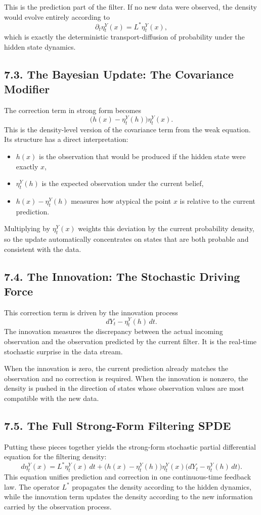 \documentclass[11pt]{article}
\theoremstyle{definition}
\theoremstyle{remark}
\begin{document}
This is the prediction part of the filter. If no new data were observed, the density would evolve entirely according to
\[
\partial_t \eta_t^Y(x)=L^*\eta_t^Y(x),
\]
which is exactly the deterministic transport-diffusion of probability under the hidden state dynamics.

\subsection*{7.3. The Bayesian Update: The Covariance Modifier}
The correction term in strong form becomes
\[
\bigl(h(x)-\eta_t^Y(h)\bigr)\eta_t^Y(x).
\]
This is the density-level version of the covariance term from the weak equation. Its structure has a direct interpretation:
\begin{itemize}
\item \(h(x)\) is the observation that would be produced if the hidden state were exactly \(x\),
\item \(\eta_t^Y(h)\) is the expected observation under the current belief,
\item \(h(x)-\eta_t^Y(h)\) measures how atypical the point \(x\) is relative to the current prediction.
\end{itemize}
Multiplying by \(\eta_t^Y(x)\) weights this deviation by the current probability density, so the update automatically concentrates on states that are both probable and consistent with the data.

\subsection*{7.4. The Innovation: The Stochastic Driving Force}
This correction term is driven by the innovation process
\[
dY_t-\eta_t^Y(h)\,dt.
\]
The innovation measures the discrepancy between the actual incoming observation and the observation predicted by the current filter. It is the real-time stochastic surprise in the data stream.

When the innovation is zero, the current prediction already matches the observation and no correction is required. When the innovation is nonzero, the density is pushed in the direction of states whose observation values are most compatible with the new data.

\subsection*{7.5. The Full Strong-Form Filtering SPDE}
Putting these pieces together yields the strong-form stochastic partial differential equation for the filtering density:
\[
d\eta_t^Y(x)
=
L^*\eta_t^Y(x)\,dt
+
\bigl(h(x)-\eta_t^Y(h)\bigr)\eta_t^Y(x)
\bigl(dY_t-\eta_t^Y(h)\,dt\bigr).
\]
This equation unifies prediction and correction in one continuous-time feedback law. The operator \(L^*\) propagates the density according to the hidden dynamics, while the innovation term updates the density according to the new information carried by the observation process.
\end{document}
